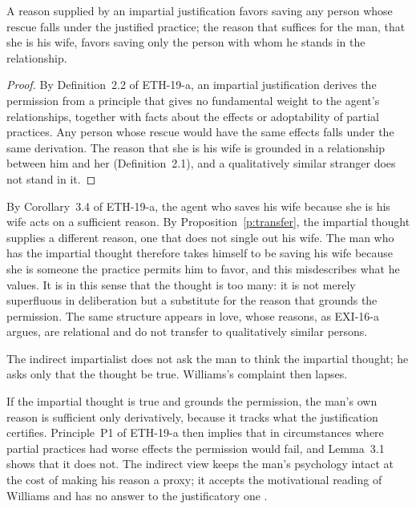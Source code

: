\documentclass{situationist-preprint}
\begin{document}
\begin{proposition}\label{p:transfer}
A reason supplied by an impartial justification favors saving any person whose rescue falls under the justified practice; the reason that suffices for the man, that she is his wife, favors saving only the person with whom he stands in the relationship.
\end{proposition}

\begin{proof}
By Definition~2.2 of ETH-19-a, an impartial justification derives the permission from a principle that gives no fundamental weight to the agent's relationships, together with facts about the effects or adoptability of partial practices. Any person whose rescue would have the same effects falls under the same derivation. The reason that she is his wife is grounded in a relationship between him and her (Definition~2.1), and a qualitatively similar stranger does not stand in it.
\end{proof}

By Corollary~3.4 of ETH-19-a, the agent who saves his wife because she is his wife acts on a sufficient reason. By Proposition~\ref{p:transfer}, the impartial thought supplies a different reason, one that does not single out his wife. The man who has the impartial thought therefore takes himself to be saving his wife because she is someone the practice permits him to favor, and this misdescribes what he values. It is in this sense that the thought is too many: it is not merely superfluous in deliberation but a substitute for the reason that grounds the permission. The same structure appears in love, whose reasons, as EXI-16-a argues, are relational and do not transfer to qualitatively similar persons.

\begin{objection}
The indirect impartialist does not ask the man to think the impartial thought; he asks only that the thought be true. Williams's complaint then lapses.
\end{objection}

\begin{reply}
If the impartial thought is true and grounds the permission, the man's own reason is sufficient only derivatively, because it tracks what the justification certifies. Principle~P1 of ETH-19-a then implies that in circumstances where partial practices had worse effects the permission would fail, and Lemma~3.1 shows that it does not. The indirect view keeps the man's psychology intact at the cost of making his reason a proxy; it accepts the motivational reading of Williams and has no answer to the justificatory one \citep[see also][]{Wolf1992}.
\end{reply}
\end{document}
